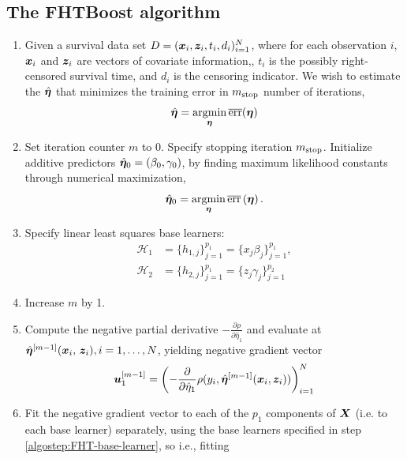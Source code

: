\begin{algorithm}
\section{The FHTBoost algorithm}
\label{algo:fhtboost}
\begin{enumerate}
    \item
        Given a survival data set $D=(\bm{x}_i, \bm{z}_i, t_i,d_i)_{i=1}^N$, where for each observation $i$,
        $\bm{x}_i$ and $\bm{z}_i$ are vectors of covariate information,, $t_i$ is the possibly right-censored survival time, and $d_i$ is the censoring indicator.
        We wish to estimate the $\hat{\boldsymbol{\eta}}$ that minimizes the training error in $m_{\text{stop}}$ number of iterations,
        \begin{equation*}
            \hat{\boldsymbol{\eta}}=\operatorname*{argmin}_{\boldsymbol{\eta}}\overline{\text{err}}(\boldsymbol{\eta})
        \end{equation*}
    \item
        Set iteration counter $m$ to $0$.
        Specify stopping iteration $m_{\text{stop}}$.
        Initialize additive predictors $\hat{\boldsymbol{\eta}}_0=\left(\beta_{0},\gamma_{0}\right)$, by finding maximum likelihood constants through numerical maximization,
        \begin{equation*}
            \hat{\boldsymbol{\eta}}_0=\operatorname*{argmin}_{\boldsymbol{\eta}}\overline{\text{err}}\left(\boldsymbol{\eta}\right).
        \end{equation*}
    \item
    \label{algostep:FHT-base-learner}
        Specify linear least squares base learners:
        \begin{align*}
            \mathcal{H}_1&=\{h_{1,j}\}_{j=1}^{p_1}=\{x_j\beta_j\}_{j=1}^{p_1}, \\
            \mathcal{H}_2&=\{h_{2,j}\}_{j=1}^{p_1}=\{z_j\gamma_j\}_{j=1}^{p_2}
        \end{align*}
    \item
    \label{algostep:FHT-init}
        Increase $m$ by 1.
    \item
        Compute the negative partial derivative $-\frac{\partial\rho}{\partial \hat{\eta}_1}$
        and evaluate at $\hat{\boldsymbol{\eta}}^{[m-1]}(\bm{x}_i,\,\bm{z}_i),i=1,\ldots,N$, yielding negative gradient vector
        \begin{equation*}
            \bm{u}^{[m-1]}_1=\left(-\frac{\partial}{\partial \hat{\eta}_1}\rho(y_i, \hat{\boldsymbol{\eta}}^{[m-1]}(\bm{x}_i,\bm{z}_i))\right)_{i=1}^N
        \end{equation*}
    \item
        Fit the negative gradient vector to each of the $p_1$ components of $\bm{X}$ (i.e. to each base learner) separately, using the base learners specified in step \ref{algostep:FHT-base-learner}, so i.e., fitting

\end{enumerate}
\end{algorithm}
